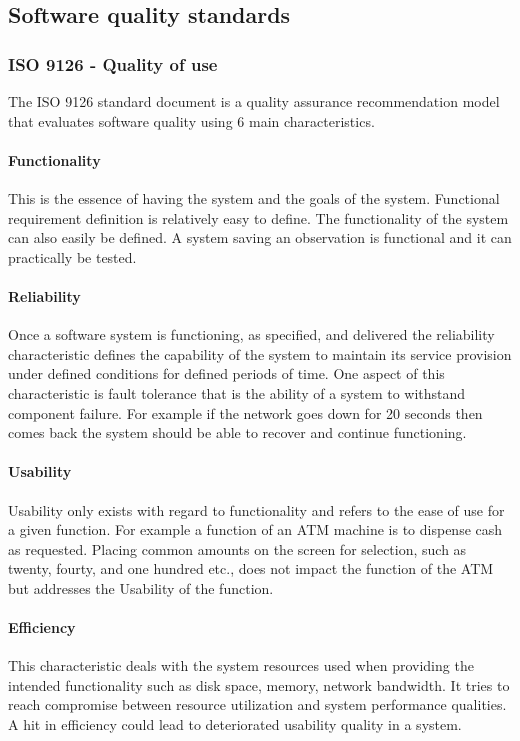 \subsection{Software quality standards}
\subsubsection{ISO 9126 - Quality of use}
The ISO 9126 standard document is a quality assurance recommendation model that evaluates software quality using 6 main characteristics.

\paragraph{Functionality}
This is the essence of having the system and the goals of the system.  Functional requirement definition is relatively easy to define. The functionality of the system can also easily be defined. A system saving an observation is functional and it can practically be tested.

\paragraph{Reliability}
Once a software system is functioning, as specified, and delivered the reliability characteristic defines the capability of the system to maintain its service provision under defined conditions for defined periods of time. One aspect of this characteristic is fault tolerance that is the ability of a system to withstand component failure. For example if the network goes down for 20 seconds then comes back the system should be able to recover and continue functioning.

\paragraph{Usability}
Usability only exists with regard to functionality and refers to the ease of use for a given function. For example a function of an ATM machine is to dispense cash as requested. Placing common amounts on the screen for selection, such as twenty, fourty, and one hundred etc., does not impact the function of the ATM but addresses the Usability of the function.

\paragraph{Efficiency}
This characteristic deals with the system resources used when providing the intended functionality such as disk space, memory, network bandwidth.
It tries to reach compromise between resource utilization and system performance qualities. A hit in efficiency could lead to deteriorated usability quality in a system.

